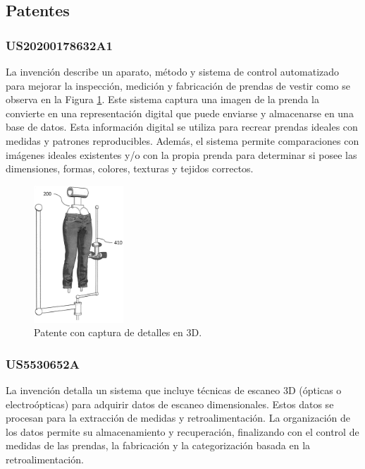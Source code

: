 \subsection{Patentes}

\subsubsection{US20200178632A1}
La invención \cite{us20200178632a1} describe un aparato, método y sistema de control automatizado para mejorar la inspección, medición y fabricación de prendas de vestir como se observa en la Figura \ref{fig:US20200178632A1-20200611-D00005}. Este sistema captura una imagen de la prenda la convierte en una representación digital que puede enviarse y almacenarse en una base de datos. Esta información digital se utiliza para recrear prendas ideales con medidas y patrones reproducibles. Además, el sistema permite comparaciones con imágenes ideales existentes y/o con la propia prenda para determinar si posee las dimensiones, formas, colores, texturas y tejidos correctos.

\begin{figure}[H]
	\centering
	\includegraphics[width=0.3\textwidth]{img/US20200178632A1-20200611-D00005.png}
	\caption{Patente con captura de detalles en 3D.}
	\label{fig:US20200178632A1-20200611-D00005}
\end{figure}

\subsubsection{US5530652A}

La invención \cite{US5530652A} detalla un sistema que incluye técnicas de escaneo 3D (ópticas o electroópticas) para adquirir datos de escaneo dimensionales. Estos datos se procesan para la extracción de medidas y retroalimentación. La organización de los datos permite su almacenamiento y recuperación, finalizando con el control de medidas de las prendas, la fabricación y la categorización basada en la retroalimentación.


